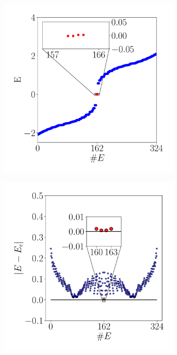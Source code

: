 


\begin{figure}[tbh!]
    \centering
   \captionsetup[sub]{font=small}

    \begin{subfigure}[b!]{0.45 \textwidth}
        \caption{}
        \includegraphics[width=\textwidth]{Imagenes/Resultados_Hoti_Cuadrado/spectre_square.pdf}
    \end{subfigure}
    \begin{subfigure}[b!]{0.45 \textwidth}
        \caption{}
        \includegraphics[width=\textwidth]{Imagenes/Resultados_Hoti_Cuadrado/spectre_square_epsi.pdf}

\end{subfigure}
\end{figure}
